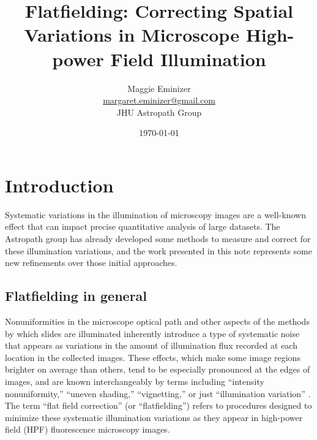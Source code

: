 \documentclass[letterpaper,11pt]{article}
\title{Flatfielding: Correcting Spatial Variations in Microscope High-power Field Illumination}
\author{Maggie Eminizer\\ \url{margaret.eminizer@gmail.com}\\ JHU Astropath Group}
\date{\today}
\begin{document}
\maketitle

\linenumbers


\section{Introduction}
\label{sec:introduction}

Systematic variations in the illumination of microscopy images are a well-known effect that can impact precise quantitative analysis of large datasets. The Astropath group has already developed some methods to measure and correct for these illumination variations, and the work presented in this note represents some new refinements over those initial approaches. 

\subsection{Flatfielding in general}
\label{ssec:flatfielding_in_general}

Nonuniformities in the microscope optical path and other aspects of the methods by which slides are illuminated inherently introduce a type of systematic noise that appears as variations in the amount of illumination flux recorded at each location in the collected images. These effects, which make some image regions brighter on average than others, tend to be especially pronounced at the edges of images, and are known interchangeably by terms including ``intensity nonuniformity,'' ``uneven shading,'' ``vignetting,'' or just ``illumination variation'' \cite{doi:10.1111/jmi.12178}. The term ``flat field correction'' (or ``flatfielding'') refers to procedures designed to minimize these systematic illumination variations as they appear in high-power field (HPF) fluorescence microscopy images. 
\end{document}
